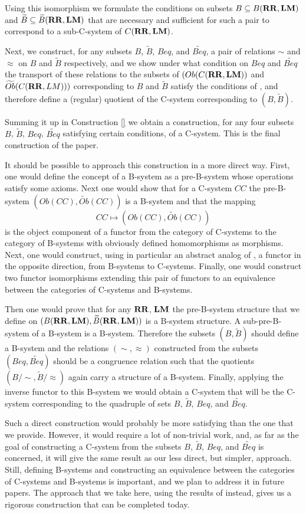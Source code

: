 \documentclass[12pt]{amsart}
\numberwithin{proposition}{subsection}
\newcommand{\wt}{\widetilde}
\newcommand{\RR}{{\bf RR}}
\newcommand{\LM}{{\bf LM}}
\begin{document}
Using this isomorphism we formulate the conditions on subsets $B\subseteq B(\RR,\LM)$
and $\wt{B}\subseteq \wt{B}(\RR,\LM)$ that are necessary and sufficient
for such a pair to correspond to a sub-C-system of $C(\RR,\LM)$.

Next, we construct, for any subsets $B$, $\wt{B}$, $Beq$, and $\wt{Beq}$, a pair
of relations $\sim$ and $\approx$ on $B$ and $\wt{B}$ respectively, and we show
under what condition on $Beq$ and $\wt{Beq}$ the transport of these relations to
the subsets of $(Ob(C(\RR,\LM))$ and $\wt{Ob}(C(\RR,LM)))$ corresponding to $B$ and
$\wt{B}$ satisfy the conditions of \cite[Prop. 5.4]{Csubsystems}, and therefore
define a (regular) quotient of the C-system corresponding to $(B,\wt{B})$.

Summing it up in Construction \ref{} we obtain a construction, for any four
subsets $B$, $\wt{B}$, $Beq$, $\wt{Beq}$ satisfying certain conditions, of a
C-system. This is the final construction of the paper.

It should be possible to approach this construction in a more direct
way. First, one would define the concept of a B-system as a pre-B-system whose
operations satisfy some axioms. Next one would show that for a C-system $CC$
the pre-B-system $(Ob(CC),\wt{Ob}(CC))$ is a B-system and that the mapping
%
$$CC\mapsto (Ob(CC),\wt{Ob}(CC))$$
%
is the object component of a functor from the category of C-systems to the
category of B-systems with obviously defined homomorphisms as morphisms. Next,
one would construct, using in particular an abstract analog of
\cite[Def. 2.11]{Hofmann}, a functor in the opposite direction, from B-systems
to C-systems. Finally, one would construct two functor isomorphisms extending
this pair of functors to an equivalence between the categories of C-systems and
B-systems.

Then one would prove that for any $\RR$, $\LM$ the pre-B-system structure that
we define on $(B(\RR,\LM),\wt{B}(\RR,\LM))$ is a B-system structure. A
sub-pre-B-system of a B-system is a B-system. Therefore the subsets
$(B,\wt{B})$ should define a B-system and the relations $(\sim,\approx)$
constructed from the subsets $(Beq,\wt{Beq})$ should be a congruence relation
such that the quotients $(B/{\sim},\wt{B}/\approx)$ again carry a structure of a
B-system. Finally, applying the inverse functor to this B-system we would
obtain a C-system that will be the C-system corresponding to the quadruple of
sets $B$, $\wt{B}$, $Beq$, and $\wt{Beq}$.

Such a direct construction would probably be more satisfying than the one that
we provide. However, it would require a lot of non-trivial work, and, as far as
the goal of constructing a C-system from the subsets $B$, $\wt{B}$, $Beq$, and
$\wt{Beq}$ is concerned, it will give the same result as our less direct, but simpler,
approach. Still, defining B-systems and constructing an equivalence between the
categories of C-systems and B-systems is important, and we plan to address it in
future papers. The approach that we take here, using the results of
\cite{Csubsystems} instead, gives us a rigorous construction that can be
completed today.
\end{document}
